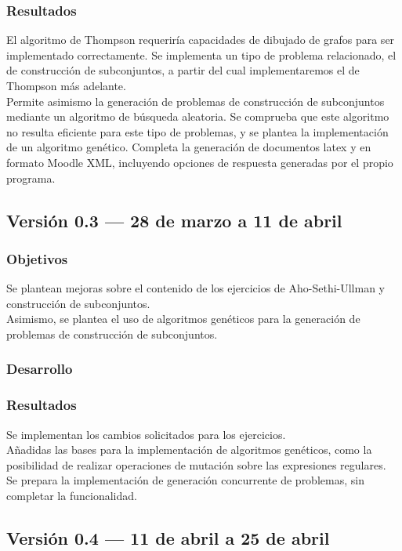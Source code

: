 \subsubsection{Resultados}

El algoritmo de Thompson requeriría capacidades de dibujado de grafos para ser implementado correctamente.
Se implementa un tipo de problema relacionado, el de construcción de subconjuntos, a partir del cual implementaremos el de Thompson más adelante.
\\
Permite asimismo la generación de problemas de construcción de subconjuntos mediante un algoritmo de búsqueda aleatoria.
Se comprueba que este algoritmo no resulta eficiente para este tipo de problemas, y se plantea la implementación de un algoritmo genético.
Completa la generación de documentos latex y en formato Moodle XML, incluyendo opciones de respuesta generadas por el propio programa.

\subsection{Versión 0.3 --- 28 de marzo a 11 de abril}

\subsubsection{Objetivos}
Se plantean mejoras sobre el contenido de los ejercicios de Aho-Sethi-Ullman y construcción de subconjuntos.
\\
Asimismo, se plantea el uso de algoritmos genéticos para la generación de problemas de construcción de subconjuntos.

\subsubsection{Desarrollo}

\subsubsection{Resultados}
Se implementan los cambios solicitados para los ejercicios.
\\
Añadidas las bases para la implementación de algoritmos genéticos, como la posibilidad de realizar operaciones de mutación sobre las expresiones regulares.
\\
Se prepara la implementación de generación concurrente de problemas, sin completar la funcionalidad.

\subsection{Versión 0.4 --- 11 de abril a 25 de abril}

